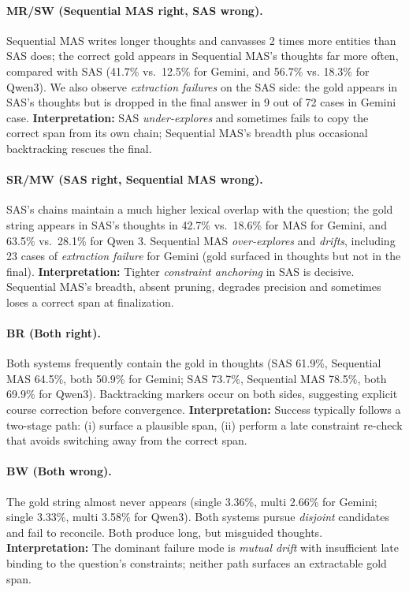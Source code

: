 \documentclass{article} %
\begin{document}
\paragraph{MR/SW (Sequential MAS right, SAS wrong).}
Sequential MAS writes longer thoughts and canvasses 2 times more entities than SAS does; the correct gold appears in Sequential MAS’s thoughts far more often, compared with SAS (41.7\% vs.\ 12.5\% for Gemini, and 56.7\% vs. 18.3\% for Qwen3). We also observe \textit{extraction failures} on the SAS side: the gold appears in SAS’s thoughts but is dropped in the final answer in 9 out of 72 cases in Gemini case.  
\textbf{Interpretation:} SAS \emph{under-explores} and sometimes fails to copy the correct span from its own chain; Sequential MAS’s breadth plus occasional backtracking rescues the final.

\paragraph{SR/MW (SAS right, Sequential MAS wrong).}
SAS’s chains maintain a much higher lexical overlap with the question; the gold string appears in SAS’s thoughts in 42.7\% vs.\ 18.6\% for MAS for Gemini, and 63.5\% vs.\ 28.1\% for Qwen 3. Sequential MAS \emph{over-explores} and \emph{drifts}, including 23 cases of \textit{extraction failure} for Gemini (gold surfaced in thoughts but not in the final).  
\textbf{Interpretation:} Tighter \emph{constraint anchoring} in SAS is decisive. Sequential MAS’s breadth, absent pruning, degrades precision and sometimes loses a correct span at finalization.

\paragraph{BR (Both right).}
Both systems frequently contain the gold in thoughts (SAS 61.9\%, Sequential MAS 64.5\%, both 50.9\% for Gemini; SAS 73.7\%, Sequential MAS 78.5\%, both 69.9\% for Qwen3). Backtracking markers occur on both sides, suggesting explicit course correction before convergence. 
\textbf{Interpretation:} Success typically follows a two-stage path: (i) surface a plausible span, (ii) perform a late constraint re-check that avoids switching away from the correct span.

\paragraph{BW (Both wrong).}
The gold string almost never appears (single 3.36\%, multi 2.66\% for Gemini; single 3.33\%, multi 3.58\% for Qwen3). Both systems pursue \emph{disjoint} candidates and fail to reconcile.  Both produce long, but misguided thoughts. 
\textbf{Interpretation:} The dominant failure mode is \textit{mutual drift} with insufficient late binding to the question’s constraints; neither path surfaces an extractable gold span.
\end{document}
